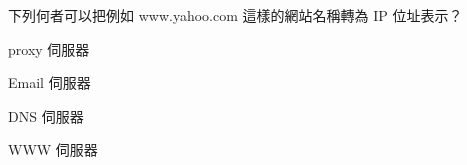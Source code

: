 \ifx\ntpcNinetyThree\undefined[93學年基北區] \fi
下列何者可以把例如 www.yahoo.com 這樣的網站名稱轉為 IP 位址表示？
  \begin{optionlist}
  \item proxy 伺服器
  \item Email 伺服器
  \item DNS 伺服器\label{ntpc-93-a23}
  \item WWW 伺服器
  \end{optionlist}
